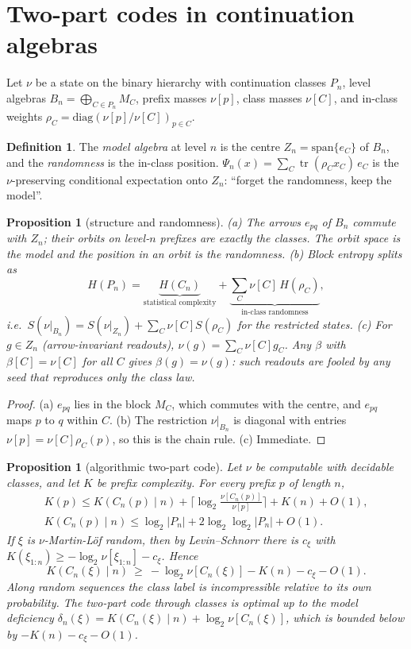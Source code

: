 \documentclass[11pt]{article}
\newtheorem{proposition}[theorem]{Proposition}
\theoremstyle{definition}
\newtheorem{definition}[theorem]{Definition}
\theoremstyle{remark}
\newcommand{\tr}{\operatorname{tr}}
\begin{document}
\section{Two-part codes in continuation algebras}\label{sec:twopart}

Let $\nu$ be a state on the binary hierarchy with continuation classes $P_n$, level algebras $B_n=\bigoplus_{C\in P_n}M_C$, prefix masses $\nu[p]$, class masses $\nu[C]$, and in-class weights $\rho_C=\mathrm{diag}(\nu[p]/\nu[C])_{p\in C}$.

\begin{definition}
The \emph{model algebra} at level $n$ is the centre $Z_n=\mathrm{span}\{e_C\}$ of $B_n$, and the \emph{randomness} is the in-class position. $\Psi_n(x)=\sum_C\tr(\rho_Cx_C)\,e_C$ is the $\nu$-preserving conditional expectation onto $Z_n$: ``forget the randomness, keep the model''.
\end{definition}

\begin{proposition}[structure and randomness]\label{prop:split}
(a) The arrows $e_{pq}$ of $B_n$ commute with $Z_n$; their orbits on level-$n$ prefixes are exactly the classes. The orbit space is the model and the position in an orbit is the randomness.
(b) Block entropy splits as
\[H(P_n)=\underbrace{H(C_n)}_{\text{statistical complexity}}+\underbrace{\textstyle\sum_C\nu[C]\,H(\rho_C)}_{\text{in-class randomness}},\]
i.e.\ $S(\nu|_{B_n})=S(\nu|_{Z_n})+\sum_C\nu[C]S(\rho_C)$ for the restricted states.
(c) For $g\in Z_n$ (arrow-invariant readouts), $\nu(g)=\sum_C\nu[C]g_C$. Any $\beta$ with $\beta[C]=\nu[C]$ for all $C$ gives $\beta(g)=\nu(g)$: such readouts are fooled by any seed that reproduces only the class law.
\end{proposition}

\begin{proof}
(a) $e_{pq}$ lies in the block $M_C$, which commutes with the centre, and $e_{pq}$ maps $p$ to $q$ within $C$. (b) The restriction $\nu|_{B_n}$ is diagonal with entries $\nu[p]=\nu[C]\rho_C(p)$, so this is the chain rule. (c) Immediate.
\end{proof}

\begin{proposition}[algorithmic two-part code]\label{prop:alg}
Let $\nu$ be computable with decidable classes, and let $K$ be prefix complexity. For every prefix $p$ of length $n$,
\begin{gather*}
K(p)\le K(C_n(p)\mid n)+\big\lceil\log_2\tfrac{\nu[C_n(p)]}{\nu[p]}\big\rceil+K(n)+O(1),\\
K(C_n(p)\mid n)\le\log_2|P_n|+2\log_2\log_2|P_n|+O(1).
\end{gather*}
If $\xi$ is $\nu$-Martin-L\"of random, then by Levin--Schnorr there is $c_\xi$ with $K(\xi_{1:n})\ge-\log_2\nu[\xi_{1:n}]-c_\xi$. Hence
\[K(C_n(\xi)\mid n)\ \ge\ -\log_2\nu[C_n(\xi)]-K(n)-c_\xi-O(1).\]
Along random sequences the class label is incompressible relative to its own probability. The two-part code through classes is optimal up to the \emph{model deficiency} $\delta_n(\xi)=K(C_n(\xi)\mid n)+\log_2\nu[C_n(\xi)]$, which is bounded below by $-K(n)-c_\xi-O(1)$.
\end{proposition}
\end{document}
